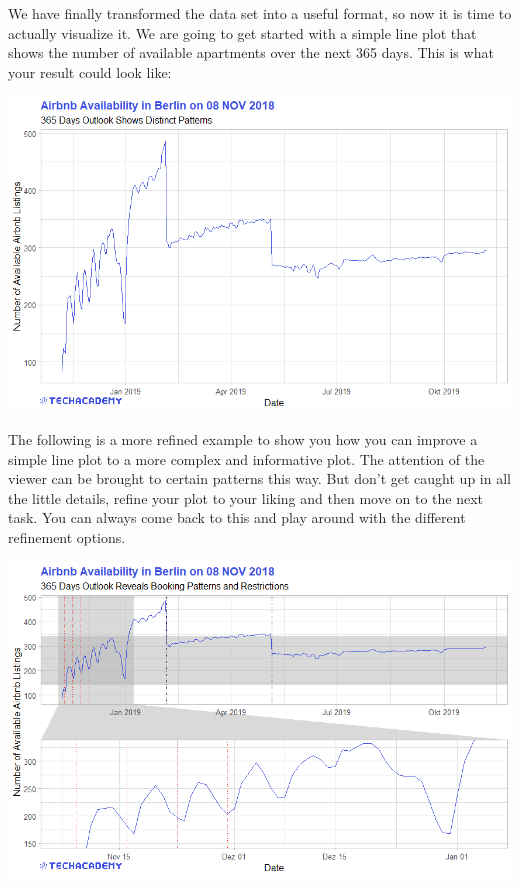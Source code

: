 \documentclass[
  11pt,
]{book}
\begin{document}
We have finally transformed the data set into a useful format, so now it is time to actually visualize it. We are going to get started with a simple line plot that shows the number of available apartments over the next 365 days. This is what your result could look like:

\begin{center}\includegraphics[width=1\linewidth]{plot/1_3_AvailabilityOutlook} \end{center}

The following is a more refined example to show you how you can improve a simple line plot to a more complex and informative plot. The attention of the viewer can be brought to certain patterns this way. But don't get caught up in all the little details, refine your plot to your liking and then move on to the next task. You can always come back to this and play around with the different refinement options.

\includegraphics[width=1\linewidth]{plot/1_3_AvailabilityOutlook_advanced}
\end{document}
